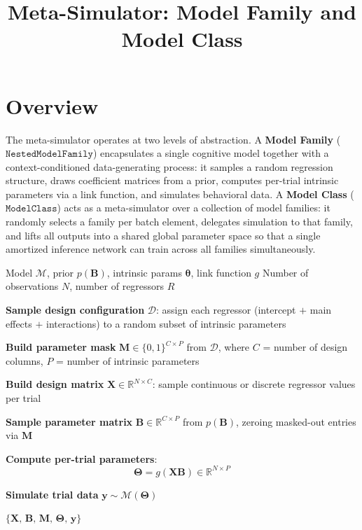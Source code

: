 \documentclass{article}
\title{Meta-Simulator: Model Family and Model Class}
\author{}
\date{}
\begin{document}
\maketitle

\section*{Overview}

The meta-simulator operates at two levels of abstraction.
A \textbf{Model Family} ($\texttt{NestedModelFamily}$) encapsulates a single
cognitive model together with a context-conditioned data-generating process:
it samples a random regression structure, draws coefficient matrices from a
prior, computes per-trial intrinsic parameters via a link function, and
simulates behavioral data.
A \textbf{Model Class} ($\texttt{ModelClass}$) acts as a meta-simulator over a
collection of model families: it randomly selects a family per batch element,
delegates simulation to that family, and lifts all outputs into a shared global
parameter space so that a single amortized inference network can train across
all families simultaneously.

\bigskip

\begin{algorithm}[H]
\caption{Model Family Simulator}
\label{alg:model-family}
\begin{algorithmic}[1]
\Require Model $\mathcal{M}$, prior $p(\mathbf{B})$, intrinsic params $\boldsymbol{\theta}$, link function $g$
\Require Number of observations $N$, number of regressors $R$

\State \textbf{Sample design configuration} $\mathcal{D}$:
    assign each regressor (intercept $+$ main effects $+$ interactions)
    to a random subset of intrinsic parameters

\State \textbf{Build parameter mask} $\mathbf{M} \in \{0,1\}^{C \times P}$
    from $\mathcal{D}$, where $C$ = number of design columns, $P$ = number of intrinsic parameters

\State \textbf{Build design matrix} $\mathbf{X} \in \mathbb{R}^{N \times C}$:
    sample continuous or discrete regressor values per trial

\State \textbf{Sample parameter matrix} $\mathbf{B} \in \mathbb{R}^{C \times P}$
    from $p(\mathbf{B})$, zeroing masked-out entries via $\mathbf{M}$

\State \textbf{Compute per-trial parameters}:
\[
    \boldsymbol{\Theta} = g(\mathbf{X}\mathbf{B}) \in \mathbb{R}^{N \times P}
\]

\State \textbf{Simulate trial data} $\mathbf{y} \sim \mathcal{M}(\boldsymbol{\Theta})$

\State \Return $\{\mathbf{X},\, \mathbf{B},\, \mathbf{M},\, \boldsymbol{\Theta},\, \mathbf{y}\}$
\end{algorithmic}
\end{algorithm}
\end{document}
